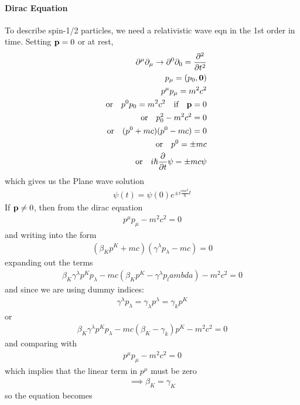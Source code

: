 \documentclass[../main.tex]{subfiles}
\begin{document}
\paragraph*{Dirac Equation} To describe spin-1/2 particles, we need a relativistic wave eqn in the
1st order in time. Setting $\vb p = 0$ or at rest,
\begin{align*}
    \partial^\mu \partial_\mu \to \partial^0 \partial_0 = \pdv[2]{t} \\
    p_\mu = (p_0, \vb 0) \\
    p^\mu p_\mu = m^2 c^2 \\
    \qor p^0 p_0 = m^2 c^2 \qqtext{if} \vb p = 0 \\
    \qor p_0^2 - m^2 c^2 = 0 \\ 
    \qor (p^0 + mc) (p^0 - mc) = 0 \\
    \qor p^0 = \pm mc \\
    \qor i\hbar \pdv{t} \psi = \pm mc \psi 
\end{align*}
which gives us the Plane wave solution
\begin{align*}
    \psi(t) = \psi(0) e^{\pm i \frac{mc^2}{\hbar} t}
\end{align*}
If $\vb p \neq 0$, then from the dirac equation
\begin{align*}
    p^\mu p_\mu - m^2 c^2 = 0
\end{align*}
and writing into the form
\begin{align*}
    (\beta_K p^K + mc)(\gamma^\lambda p_\lambda - mc) = 0
\end{align*}
expanding out the terms
\begin{align*}
    \beta_K \gamma^\lambda p^K p_\lambda - mc(\beta_K p^K - \gamma^\lambda p_lambda) - m^2 c^2 = 0
\end{align*}
and since we are using dummy indices:
\begin{align*}
    \gamma^\lambda p_\lambda = \gamma_\lambda p^\lambda = \gamma_k p^K
\end{align*}
or
\begin{align*}
    \beta_K \gamma^\lambda p^K p_\lambda - mc(\beta_K- \gamma_k)p^K - m^2 c^2 = 0
\end{align*}
and comparing with
\begin{align*}
    p^\mu p_\mu - m^2 c^2 = 0
\end{align*}
which implies that the linear term in $p^\mu$ must be zero
\begin{align*}
    \implies \beta_K = \gamma_K
\end{align*}
so the equation becomes
\end{document}
